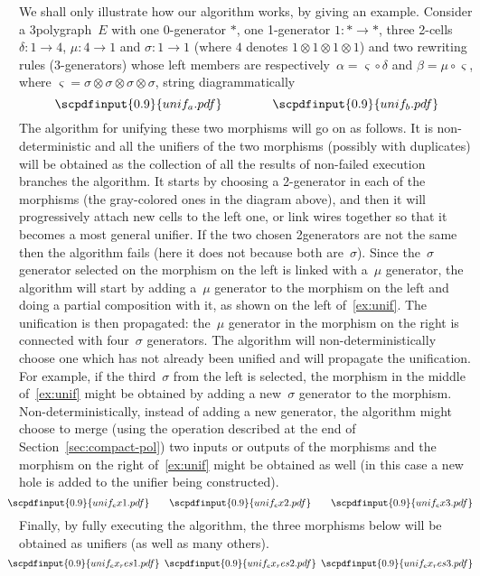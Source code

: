 \documentclass{LMCS}
\newcommand{\strid}[1]{\scpdfinput{0.9}{#1.pdf}}
\begin{document}
We shall only illustrate how our algorithm works, by giving an example. Consider
a 3\nbd{}polygraph~$E$ with one 0-generator $*$, one 1-generator $1:*\to *$,
three 2-cells $\delta:1\to 4$, $\mu:4\to 1$ and $\sigma:1\to 1$ (where $4$
denotes $1\otimes 1\otimes 1\otimes 1$) and two rewriting rules (3-generators)
whose left members are respectively~$\alpha=\varsigma\circ\delta$ and
$\beta=\mu\circ\varsigma$, where
$\varsigma=\sigma\otimes\sigma\otimes\sigma\otimes\sigma$, \ie string
diagrammatically
\[
\strid{unif_a}
\qquad\qquad
\strid{unif_b}
\]
The algorithm for unifying these two morphisms will go on as follows.
It is non-deterministic and all the unifiers of the two morphisms
(possibly with duplicates) will be obtained as the collection of all the results
of non-failed execution branches the algorithm. It starts by choosing
a 2-generator in each of the morphisms (the gray-colored ones in the diagram
above), and then it will progressively attach new cells to the left one, or link
wires together so that it becomes a most general unifier. If the two chosen
2\nbd{}generators are not the same then the algorithm fails (here it does not
because both are~$\sigma$). Since the~$\sigma$ generator selected on the
morphism on the left is linked with a~$\mu$ generator, the algorithm will start
by adding a~$\mu$ generator to the morphism on the left and doing a partial
composition with it, as shown on the left of~\eqref{ex:unif}. The unification is
then propagated: the~$\mu$ generator in the morphism on the right is connected
with four~$\sigma$ generators. The algorithm will non-deterministically choose
one which has not already been unified and will propagate the unification. For
example, if the third~$\sigma$ from the left is selected, the morphism in the
middle of~\eqref{ex:unif} might be obtained by adding a new~$\sigma$ generator
to the morphism. Non-deterministically, instead of adding a new generator, the
algorithm might choose to merge (using the operation described at the end of
Section~\ref{sec:compact-pol}) two inputs or outputs of the morphisms and the
morphism on the right of~\eqref{ex:unif} might be obtained as well (in this case
a new hole is added to the unifier being constructed).
\begin{equation}
  \label{ex:unif}
  \hspace{-3ex}
  \strid{unif_ex1}
  \qquad
  \strid{unif_ex2}
  \qquad
  \strid{unif_ex3}
\end{equation}
Finally, by fully executing the algorithm, the three morphisms below will be
obtained as unifiers (as well as many others).
\begin{equation*}
  \hspace{-3ex}
  \strid{unif_ex_res1}
  \enspace
  \strid{unif_ex_res2}
  \enspace
  \strid{unif_ex_res3}
\end{equation*}
\end{document}
